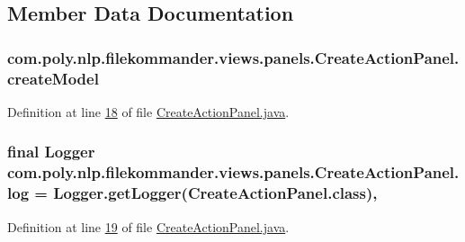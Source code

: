 \subsection{Member Data Documentation}
\hypertarget{classcom_1_1poly_1_1nlp_1_1filekommander_1_1views_1_1panels_1_1_create_action_panel_a7188ccd78e66b6a4fe3dd838fc1ae2f1}{
\subsubsection[{create\-Model}]{ com.\-poly.\-nlp.\-filekommander.\-views.\-panels.\-Create\-Action\-Panel.\-create\-Model\hspace{0.3cm}{\ttfamily [private]}}}\label{classcom_1_1poly_1_1nlp_1_1filekommander_1_1views_1_1panels_1_1_create_action_panel_a7188ccd78e66b6a4fe3dd838fc1ae2f1}


Definition at line \hyperlink{L18}{18} of file \hyperlink{}{Create\-Action\-Panel.\-java}.

\hypertarget{classcom_1_1poly_1_1nlp_1_1filekommander_1_1views_1_1panels_1_1_create_action_panel_af5dbfc85e283c5049b04b0bc4d066a97}{
\subsubsection[{log}]{\setlength{\rightskip}{0pt plus 5cm}final Logger com.\-poly.\-nlp.\-filekommander.\-views.\-panels.\-Create\-Action\-Panel.\-log = Logger.\-get\-Logger(Create\-Action\-Panel.\-class)\hspace{0.3cm}{\ttfamily [static]}, {\ttfamily [private]}}}\label{classcom_1_1poly_1_1nlp_1_1filekommander_1_1views_1_1panels_1_1_create_action_panel_af5dbfc85e283c5049b04b0bc4d066a97}


Definition at line \hyperlink{L19}{19} of file \hyperlink{}{Create\-Action\-Panel.\-java}.

